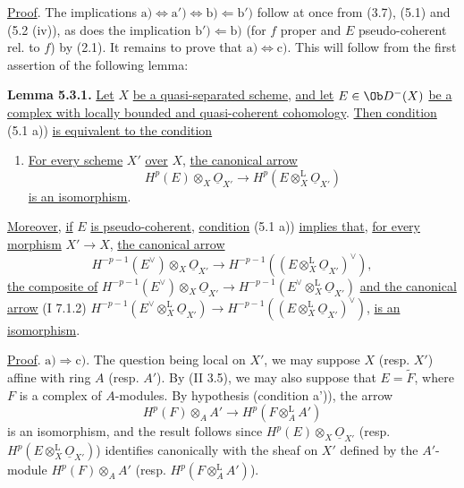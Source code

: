 \uline{Proof}. The implications \(\mathrm a)\Longleftrightarrow\mathrm a')\Longleftrightarrow\mathrm b)\Longleftarrow\mathrm b')\) follow at once from (3.7), (5.1) and (5.2 (iv)), as does the implication \(\mathrm b')\Longleftarrow\mathrm b)\) (for \(f\) proper and \(E\) pseudo-coherent rel. to \(f\)) by (2.1). It remains to prove that \(\mathrm a)\Longleftrightarrow\mathrm c)\). This will follow from the first assertion of the following lemma:

\textbf{Lemma 5.3.1.} \uline{Let} \(X\) \uline{be a quasi-separated scheme}, \uline{and let} \(E\in\Ob D^{-}(X)\) \uline{be a complex with locally bounded and quasi-coherent cohomology}. \uline{Then condition} (5.1 a)) \uline{is equivalent to the condition}
\begin{enumerate}[label=\alph*)]
\item[c)] \uline{For every scheme} \(X'\) \uline{over} \(X\), \uline{the canonical arrow}
\[
 H^p(E)\otimes_X\underline{O}_{X'}\longrightarrow H^p(E\otimes_X^{\mathrm L}\underline{O}_{X'})
\]
\uline{is an isomorphism}.
\end{enumerate}
\uline{Moreover}, \uline{if} \(E\) \uline{is pseudo-coherent}, \uline{condition} (5.1 a)) \uline{implies that}, \uline{for every morphism} \(X'\to X\), \uline{the canonical arrow}
\begin{equation}
 H^{-p-1}(E^{\vee})\otimes_X\underline{O}_{X'}\longrightarrow H^{-p-1}((E\otimes_X^{\mathrm L}\underline{O}_{X'})^{\vee}),\tag{5.3.1.1}
\end{equation}
%
\uline{the composite of} \(H^{-p-1}(E^{\vee})\otimes_X\underline{O}_{X'}\longrightarrow H^{-p-1}(E^{\vee}\otimes_X^{\mathrm L}\underline{O}_{X'})\) \uline{and the canonical arrow} (I 7.1.2) \(H^{-p-1}(E^{\vee}\otimes_X^{\mathrm L}\underline{O}_{X'})\longrightarrow H^{-p-1}((E\otimes_X^{\mathrm L}\underline{O}_{X'})^{\vee})\), \uline{is an isomorphism}.

\uline{Proof}. \(\mathrm a)\Longrightarrow\mathrm c)\). The question being local on \(X'\), we may suppose \(X\) (resp. \(X'\)) affine with ring \(A\) (resp. \(A'\)). By (II 3.5), we may also suppose that \(E=\widetilde F\), where \(F\) is a complex of \(A\)-modules. By hypothesis (condition a')), the arrow
\[
 H^p(F)\otimes_A A'\longrightarrow H^p(F\otimes_A^{\mathrm L}A')
\]
is an isomorphism, and the result follows since \(H^p(E)\otimes_X\underline{O}_{X'}\) (resp. \(H^p(E\otimes_X^{\mathrm L}\underline{O}_{X'})\)) identifies canonically with the sheaf on \(X'\) defined by the \(A'\)-module \(H^p(F)\otimes_A A'\) (resp. \(H^p(F\otimes_A^{\mathrm L}A')\)).

